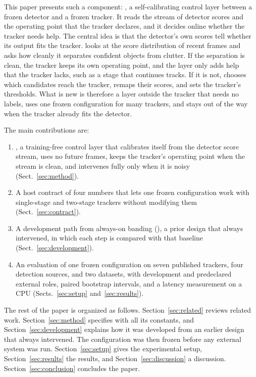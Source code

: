This paper presents such a component: \scl{}, a self-calibrating control layer
between a frozen detector and a frozen tracker. It reads the stream of detector scores
and the operating point that the tracker declares, and it decides online
whether the tracker needs help. The central idea is that the detector's own
scores tell whether its output fits the tracker. \scl{} looks at the score
distribution of recent frames and asks how cleanly it separates confident
objects from clutter. If the separation is clean, the tracker keeps its own
operating point, and the layer only adds help that the tracker lacks, such as
a stage that continues tracks. If it is not, \scl{} chooses which candidates reach the
tracker, remaps their scores, and sets the tracker's thresholds. What is new
is therefore a layer outside the tracker that needs no labels, uses one frozen
configuration for many trackers, and stays out of the way when the tracker
already fits the detector.

The main contributions are:
\begin{enumerate}
\item \scl{}, a training-free control layer that calibrates itself from the detector
      score stream, uses no future frames, keeps the tracker's operating point
      when the stream is clean, and intervenes fully only when it is noisy
      (Sect.~\ref{sec:method}).
\item A host contract of four numbers that lets one frozen configuration work
      with single-stage and two-stage trackers
      without modifying them (Sect.~\ref{sec:contract}).
\item A development path from always-on banding (\aob{}), a prior design that
      always intervened, in which
      each step is compared with that baseline (Sect.~\ref{sec:development}).
\item An evaluation of one frozen configuration on seven published trackers,
      four detection sources, and two datasets, with development and
      predeclared external roles, paired bootstrap intervals, and a
      latency measurement on a CPU (Sects.~\ref{sec:setup}
      and~\ref{sec:results}).
\end{enumerate}

The rest of the paper is organized as follows. Section~\ref{sec:related}
reviews related work. Section~\ref{sec:method} specifies \scl{} with all its
constants, and Section~\ref{sec:development} explains how it was developed
from an earlier design that always intervened. The configuration was then
frozen before any external system was run.
Section~\ref{sec:setup} gives the experimental setup,
Section~\ref{sec:results} the results, and Section~\ref{sec:discussion} a
discussion. Section~\ref{sec:conclusion} concludes the paper.
